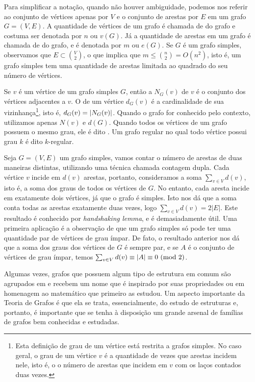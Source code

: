 Para simplificar a notação, quando não houver ambiguidade, podemos nos referir ao conjunto de vértices apenas por $V$ e o conjunto de arestas por $E$ em um grafo $G = (V,E)$. A quantidade de vértices de um grafo é chamada de  do grafo e costuma ser denotada por $n$ ou $v(G)$. Já a quantidade de arestas em um grafo é chamada de  do grafo, e é denotada por $m$ ou $e(G)$. Se $G$ é um grafo simples, observamos que $E \subset \binom{V}{2}$, o que implica que $m \leq \binom{n}{2} = O(n^2)$, isto é, um grafo simples tem uma quantidade de arestas limitada ao quadrado do seu número de vértices.

Se $v$ é um vértice de um grafo simples $G$, então a  $N_G(v)$ de $v$ é o conjunto dos vértices adjacentes a $v$. O  de um vértice $d_G(v)$ é a cardinalidade de sua vizinhança\footnote{Esta definição de grau de um vértice está restrita a grafos simples. No caso geral, o grau de um vértice $v$ é a quantidade de vezes que arestas incidem nele, isto é, o o número de arestas que incidem em $v$ com os laços contados duas vezes.}, isto é, $d_G(v) = \left | N_G(v) \right |$. Quando o grafo for conhecido pelo contexto, utilizamos apenas $N(v)$ e $d(G)$. Quando todos os vértices de um grafo possuem o mesmo grau, ele é dito . Um grafo regular no qual todo vértice possui grau $k$ é dito $k$-regular.

Seja $G = (V,E)$ um grafo simples, vamos contar o número de arestas de duas maneiras distintas, utilizando uma técnica chamada contagem dupla. Cada vértice $v$ incide em $d(v)$ arestas, portanto, consideramos a soma $\sum_{v \in V}d(v)$, isto é, a soma dos graus de todos os vértices de $G$. No entanto, cada aresta incide em exatamente dois vértices, já que o grafo é simples. Isto nos dá que a soma conta todas as arestas exatamente duas vezes, logo $\sum_{v \in V}d(v) = 2|E|$. Este resultado é conhecido por \emph{handshaking lemma}, e é demasiadamente útil. Uma primeira aplicação é a observação de que um grafo simples só pode ter uma quantidade par de vértices de grau ímpar. De fato, o resultado anterior nos dá que a soma dos graus dos vértices de $G$ é sempre par, e se $A$ é o conjunto de vértices de grau ímpar, temos $\sum_{v \in V}d(v) \equiv |A| \equiv 0 \ (\text{mod}\ 2)$.

Algumas vezes, grafos que possuem algum tipo de estrutura em comum são agrupados em  e recebem um nome que é inspirado por suas propriedades ou em homenagem ao matemático que primeiro as estudou. Um aspecto importante da Teoria de Grafos é que ela se trata, essencialmente, do estudo de estruturas e, portanto, é importante que se tenha à disposição um grande arsenal de famílias de grafos bem conhecidas e estudadas.

